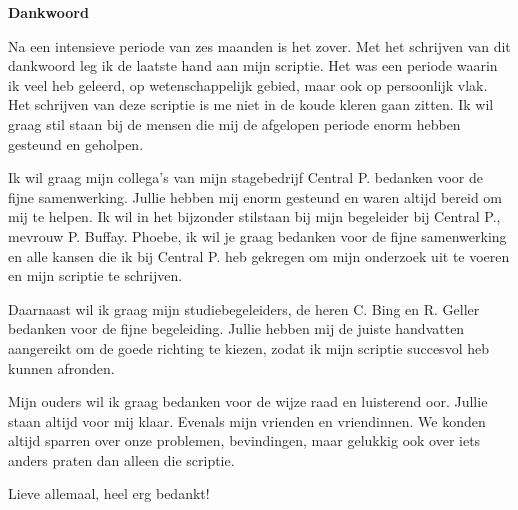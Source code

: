 \thispagestyle{empty}    %

\begin{center}
\textbf{Dankwoord}



Na een intensieve periode van zes maanden is het zover. Met het schrijven van dit dankwoord leg ik de laatste hand aan mijn scriptie. Het was een periode waarin ik veel heb geleerd, op wetenschappelijk gebied, maar ook op persoonlijk vlak. Het schrijven van deze scriptie is me niet in de koude kleren gaan zitten. Ik wil graag stil staan bij de mensen die mij de afgelopen periode enorm hebben gesteund en geholpen.

Ik wil graag mijn collega’s van mijn stagebedrijf Central P. bedanken voor de fijne samenwerking. Jullie hebben mij enorm gesteund en waren altijd bereid om mij te helpen. Ik wil in het bijzonder stilstaan bij mijn begeleider bij Central P., mevrouw P. Buffay. Phoebe, ik wil je graag bedanken voor de fijne samenwerking en alle kansen die ik bij Central P. heb gekregen om mijn onderzoek uit te voeren en mijn scriptie te schrijven.

Daarnaast wil ik graag mijn studiebegeleiders, de heren C. Bing en R. Geller bedanken voor de fijne begeleiding. Jullie hebben mij de juiste handvatten aangereikt om de goede richting te kiezen, zodat ik mijn scriptie succesvol heb kunnen afronden.

Mijn ouders wil ik graag bedanken voor de wijze raad en luisterend oor. Jullie staan altijd voor mij klaar. Evenals mijn vrienden en vriendinnen. We konden altijd sparren over onze problemen, bevindingen, maar gelukkig ook over iets anders praten dan alleen die scriptie.

Lieve allemaal, heel erg bedankt!

\end{center}
